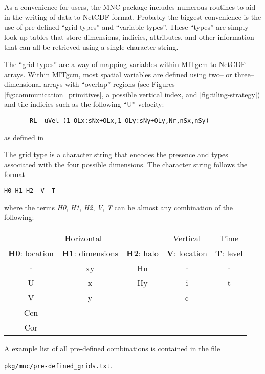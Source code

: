 As a convenience for users, the MNC package includes numerous routines
to aid in the writing of data to NetCDF format.  Probably the biggest
convenience is the use of pre-defined ``grid types'' and ``variable
types''.  These ``types'' are simply look-up tables that store
dimensions, indicies, attributes, and other information that can all
be retrieved using a single character string.

The ``grid types'' are a way of mapping variables within MITgcm to
NetCDF arrays.  Within MITgcm, most spatial variables are defined
using two-- or three--dimensional arrays with ``overlap'' regions (see
Figures \ref{fig:communication_primitives}, a possible vertical index,
and \ref{fig:tiling-strategy}) and tile indicies such as the following
``U'' velocity:
\begin{verbatim}
      _RL  uVel (1-OLx:sNx+OLx,1-OLy:sNy+OLy,Nr,nSx,nSy)
\end{verbatim}
as defined in 

The grid type is a character string that encodes the presence and
types associated with the four possible dimensions.  The character
string follows the format
\begin{center}
  \texttt{H0\_H1\_H2\_\_V\_\_T}
\end{center}
where the terms \textit{H0}, \textit{H1}, \textit{H2}, \textit{V},
\textit{T} can be almost any combination of the following:
\begin{center}
  \begin{tabular}[h]{|ccc|c|c|}\hline
    \multicolumn{3}{|c|}{Horizontal} & Vertical & Time \\
    \textbf{H0}: location & \textbf{H1}: dimensions & \textbf{H2}: halo 
          & \textbf{V}: location & \textbf{T}: level  \\\hline
    \texttt{-} & xy & Hn & \texttt{-} & \texttt{-} \\
    U  &  x  &  Hy  &  i  &  t  \\
    V  &  y  &      &  c  &     \\
    Cen  &   &      &     &     \\
    Cor  &   &      &     &     \\\hline
  \end{tabular}
\end{center}
A example list of all pre-defined combinations is contained in the
file
\begin{center}
  \texttt{pkg/mnc/pre-defined\_grids.txt}.
\end{center}

